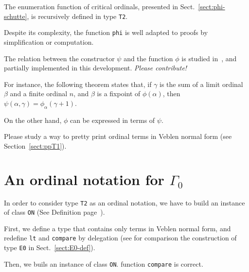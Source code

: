 {The enumeration function of critical ordinals, presented in Sect.~\vref{sect:phi-schutte}, is recursively defined in type \texttt{T2}.



Despite its complexity, the function \texttt{phi} is well adapted to proofs by simplification or computation.


The relation between the constructor $\psi$ and the function $\phi$ is
studied in~\cite{schutte}, and partially implemented in this development.
\emph{Please contribute!}
 
For instance, the following theorem states that, if $\gamma$ is the sum of a limit ordinal $\beta$ and a finite ordinal $n$, and $\beta$ is a fixpoint of
$\phi(\alpha)$, then $\psi(\alpha,\gamma)=\phi_\alpha(\gamma+1)$.







On the other hand, $\phi$ can be expressed in terms of $\psi$.




\begin{project}
Please study a way to pretty print ordinal terms in Veblen normal form (see Section~\vref{sect:ppT1}).
\end{project}

\section{An ordinal notation for \texorpdfstring{$\Gamma_0$}{\texttt{Gamma0}}}

In order to consider type \texttt{T2} as an ordinal notation, we have to build an instance of class \texttt{ON} (See Definition page~\pageref{types:ON}).

First, we define a type that contains only terms in Veblen normal form, and redefine \texttt{lt} and \texttt{compare} by delegation (see for comparison the construction of type \texttt{E0} in Sect.~\vref{sect:E0-def}).





Then, we buils an instance of class \texttt{ON}. 
function \texttt{compare} is correct.







}
